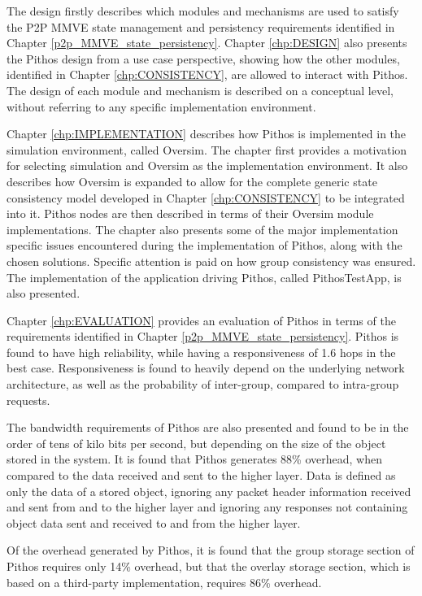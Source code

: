The design firstly describes which modules and mechanisms are used to satisfy the P2P MMVE state management and persistency requirements identified in Chapter \ref{p2p_MMVE_state_persistency}. Chapter \ref{chp:DESIGN} also presents the Pithos design from a use case perspective, showing how the other modules, identified in Chapter \ref{chp:CONSISTENCY}, are allowed to interact with Pithos. The design of each module and mechanism is described on a conceptual level, without referring to any specific implementation environment.

Chapter \ref{chp:IMPLEMENTATION} describes how Pithos is implemented in the simulation environment, called Oversim. The chapter first provides a motivation for selecting simulation and Oversim as the implementation environment. It also describes how Oversim is expanded to allow for the complete generic state consistency model developed in Chapter \ref{chp:CONSISTENCY} to be integrated into it. Pithos nodes are then described in terms of their Oversim module implementations. The chapter also presents some of the major implementation specific issues encountered during the implementation of Pithos, along with the chosen solutions. Specific attention is paid on how group consistency was ensured. The implementation of the application driving Pithos, called PithosTestApp, is also presented.

Chapter \ref{chp:EVALUATION} provides an evaluation of Pithos in terms of the requirements identified in Chapter \ref{p2p_MMVE_state_persistency}. Pithos is found to have high reliability, while having a responsiveness of 1.6 hops in the best case. Responsiveness is found to heavily depend on the underlying network architecture, as well as the probability of inter-group, compared to intra-group requests.

The bandwidth requirements of Pithos are also presented and found to be in the order of tens of kilo bits per second, but depending on the size of the object stored in the system. It is found that Pithos generates 88\% overhead, when compared to the data received and sent to the higher layer. Data is defined as only the data of a stored object, ignoring any packet header information received and sent from and to the higher layer and ignoring any responses not containing object data sent and received to and from the higher layer.

Of the overhead generated by Pithos, it is found that the group storage section of Pithos requires only 14\% overhead, but that the overlay storage section, which is based on a third-party implementation, requires 86\% overhead.

